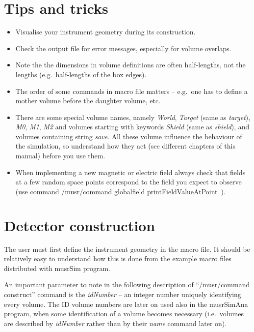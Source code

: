\documentclass[twoside]{dis04}
\begin{document}
\section{Tips and tricks}
\begin{itemize}
  \item Visualise your instrument geometry during its construction.
  \item Check the output file for error messages, especially for volume overlaps.
  \item Note the the dimensions in volume definitions are often half-lengths, not
        the lengths (e.g.\ half-lengths of the box edges).
  \item The order of some commands in macro file matters -- e.g.\ one has to define
        a mother volume before the daughter volume, etc.
  \item There are some special volume names, namely \emph{World}, 
        \emph{Target}  (same as \emph{target}), \emph{M0}, \emph{M1}, \emph{M2} and
	volumes starting with keywords \emph{Shield} (same as \emph{shield}), and
	volumes containing string \emph{save}.  All these volume influence the
	behaviour of the simulation, so understand how they act (see different chapters
	of this manual) before you use them.
  \item When implementing a new magnetic or electric field always check that fields at
        a few random space points correspond to the field you expect to observe
        (use command /musr/command globalfield printFieldValueAtPoint~).
\end{itemize}
\section{Detector construction}
The user must first define the instrument geometry in the macro file. It should be relatively
easy to understand how this is done from the example macro files distributed with musrSim
program.

An important parameter to note in the following description of ``/musr/command construct'' 
command is the \emph{idNumber} -- an integer number uniquely identifying every volume.  
The ID volume numbers are later on used also in the musrSimAna program, when some identification 
of a volume becomes necessary (i.e.\ volumes are described by \emph{idNumber} rather than
by their \emph{name} command later on).
\end{document}
